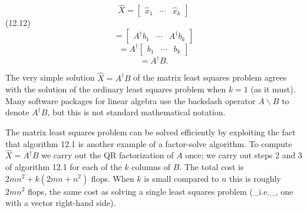 \[\hat{X} = \left[\begin{array}{cccc}\hat{x}_{1}&\cdots&\hat{x}_{k}\end{array}\right]\] (12.12) \[= \left[\begin{array}{cccc}A^{\dagger}b_{1}&\cdots&A^{\dagger}b_{ k}\end{array}\right]\] \[= A^{\dagger}\left[\begin{array}{cccc}b_{1}&\cdots&b_{k}\end{array}\right]\] \[= A^{\dagger}B.\]

The very simple solution \(\hat{X}=A^{\dagger}B\) of the matrix least squares problem agrees with the solution of the ordinary least squares problem when \(k=1\) (as it must). Many software packages for linear algebra use the backslash operator \(A\backslash B\) to denote \(A^{\dagger}B\), but this is not standard mathematical notation.

The matrix least squares problem can be solved efficiently by exploiting the fact that algorithm 12.1 is another example of a factor-solve algorithm. To compute \(\hat{X}=A^{\dagger}B\) we carry out the QR factorization of \(A\) once; we carry out steps 2 and 3 of algorithm 12.1 for each of the \(k\) columns of \(B\). The total cost is \(2mn^{2}+k(2mn+n^{2})\) flops. When \(k\) is small compared to \(n\) this is roughly \(2mn^{2}\) flops, the same cost as solving a single least squares problem (_i.e._, one with a vector right-hand side).

 